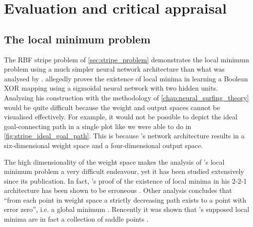 \chapter{Evaluation and critical appraisal}

\section{The local minimum problem}
\label{sec:eval_local_minimum_problem}
The RBF stripe problem of \ref{sec:stripe_problem} demonstrates the local minimum problem using a much simpler neural network architecture than what was analysed by \textcite{blum1989}. 
\citeauthor{blum1989} allegedly proves the existence of local minima in learning a Boolean XOR mapping using a sigmoidal neural network with two hidden units.
Analysing his construction with the methodology of \ref{chap:neural_surfing_theory} would be quite difficult because the weight and output spaces cannot be visualised effectively.
For example, it would not be possible to depict the ideal goal-connecting path in a single plot like we were able to do in \ref{fig:stripe_ideal_goal_path}.
This is because \citeauthor{blum1989}'s network architecture results in a six-dimensional weight space and a four-dimensional output space. 

The high dimensionality of the weight space makes the analysis of \citeauthor{blum1989}'s local minimum problem a very difficult endeavour, yet it has been studied extensively since its publication.
In fact, \citeauthor{blum1989}'s proof of the existence of local minima in his 2-2-1 architecture has been shown to be erroneous \cite{hamey1998}. 
Other analysis concludes that ``from each point in weight space a strictly decreasing path exists to a point with error zero'', i.e. a global minimum \cite*{sprinkhuizen1999}.
Rencently it was shown that \citeauthor{blum1989}'s supposed local minima are in fact a collection of saddle points \cite{mizutani2010}.

